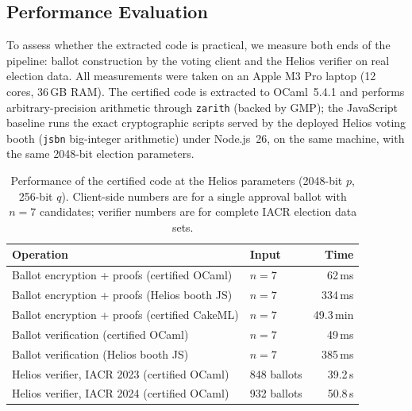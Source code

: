\documentclass[sigconf,anonymous,review]{acmart}
\begin{document}
  


\subsection{Performance Evaluation}\label{perf_eval}
To assess whether the extracted code is practical, we measure both ends of the pipeline: ballot construction by the voting client and the Helios verifier on real election data. All measurements were taken on an Apple M3 Pro laptop (12 cores, 36\,GB RAM). The certified code is extracted to OCaml~5.4.1 and performs arbitrary-precision arithmetic through \texttt{zarith} (backed by GMP); the JavaScript baseline runs the exact cryptographic scripts served by the deployed Helios voting booth (\texttt{jsbn} big-integer arithmetic) under Node.js~26, on the same machine, with the same 2048-bit election parameters.

\begin{table}
  \caption{Performance of the certified code at the Helios parameters (2048-bit $p$, 256-bit $q$). Client-side numbers are for a single approval ballot with $n = 7$ candidates; verifier numbers are for complete IACR election data sets.}
  \label{tab:perf}
  \small
  \begin{tabular}{@{}llr@{}}
    \toprule
    Operation & Input & Time\\
    \midrule
    Ballot encryption + proofs (certified OCaml) & $n = 7$ & 62\,ms\\
    Ballot encryption + proofs (Helios booth JS) & $n = 7$ & 334\,ms\\
    Ballot encryption + proofs (certified CakeML) & $n = 7$ & 49.3\,min\\
    Ballot verification (certified OCaml) & $n = 7$ & 49\,ms\\
    Ballot verification (Helios booth JS) & $n = 7$ & 385\,ms\\
    Helios verifier, IACR 2023 (certified OCaml) & 848 ballots & 39.2\,s\\
    Helios verifier, IACR 2024 (certified OCaml) & 932 ballots & 50.8\,s\\
    \bottomrule
  \end{tabular}
\end{table}
\end{document}
